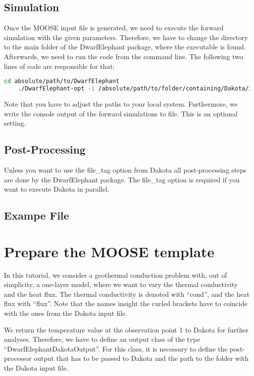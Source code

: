\documentclass[11pt, a4paper, DIV=14]{scrartcl}
\begin{document}
\subsection{Simulation}
Once the MOOSE input file is generated, we need to execute the forward simulation with the given parameters. Therefore, we have to change the directory to the main folder of the DwarfElephant package, where the executable is found. Afterwards, we need to run the code from the command line. The following two lines of code are responsible for that:
\begin{lstlisting}[language=bash]
    cd absolute/path/to/DwarfElephant
    ./DwarfElephant-opt -i /absolute/path/to/folder/containing/Dakota/inputfile/moose.i >> /absolute/path/to/folder/containing/Dakota/inputfile/console.txt 2>&1
\end{lstlisting}
Note that you have to adjust the paths to your local system. Furthermore, we write the console output of the forward simulations to file. This is an optional setting.

\subsection{Post-Processing}
Unless you want to use the file\_tag option from Dakota all post-processing steps are done by the DwarfElephant package. The file\_tag option is required if you want to execute Dakota in parallel.

\subsection{Exampe File}


\section{Prepare the MOOSE template}
In this tutorial, we consider a geothermal conduction problem with, out of simplicity, a one-layer model, where we want to vary the thermal conductivity and the heat flux. The thermal conductivity is denoted with ``{cond}'', and the heat flux with ``{flux}''. Note that the names insight the curled brackets have to coincide with the ones from the Dakota input file.

We return the temperature value at the observation point 1 to Dakota for further analyses. Therefore, we have to define an output class of the type ``DwarfElephantDakotaOutput''. For this class, it is necessary to define the post-processor output that has to be passed to Dakota and the path to the folder with the Dakota input file.
\end{document}

